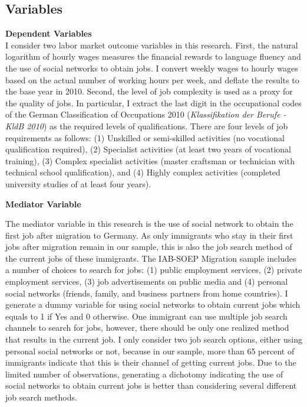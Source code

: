 \documentclass[12pt,a4paper]{article}
\begin{document}
\subsection{Variables}
\textbf{Dependent Variables} \\
I consider two labor market outcome variables in this research. First, the natural logarithm of hourly wages measures the financial rewards to language fluency and the use of social networks to obtain jobs. I convert weekly wages to hourly wages based on the actual number of working hours per week, and deflate the results to the base year in 2010. Second, the level of job complexity is used as a proxy for the quality of jobs. In particular, I extract the last digit in the occupational codes of the German Classification of Occupations 2010 (\textit{Klassifikation der Berufe - KldB 2010}) as the required levels of qualifications. There are four levels of job requirements as follows: (1) Unskilled or semi-skilled activities (no vocational qualification required), (2) Specialist activities (at least two years of vocational training), (3) Complex specialist activities (master craftsman or technician with technical school qualification), and (4) Highly complex activities (completed university studies of at least four years). 

\begin{flushleft}
\textbf{Mediator Variable} 
\end{flushleft}

The mediator variable in this research is the use of social network to obtain the first job after migration to Germany. As only immigrants who stay in their first jobs after migration remain in our sample, this is also the job search method of the current jobs of these immigrants. The IAB-SOEP Migration sample includes a number of choices to search for jobs: (1) public employment services, (2) private employment services, (3) job advertisements on public media and (4) personal social networks (friends, family, and business partners from home countries). I generate a dummy variable for using social networks to obtain current jobs which equals to 1 if Yes and 0 otherwise. One immigrant can use multiple job search channels to search for jobs, however, there should be only one realized method that results in the current job. I only consider two job search options, either using personal social networks or not, because in our sample, more than 65 percent of immigrants indicate that this is their channel of getting current jobs. Due to the limited number of observations, generating a dichotomy indicating the use of social networks to obtain current jobs is better than considering several different job search methods. 
\end{document}
